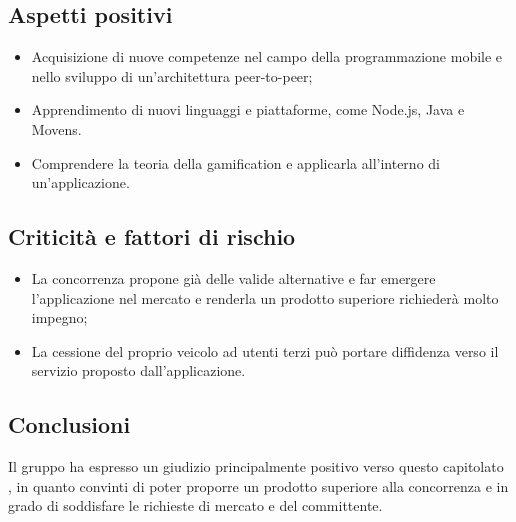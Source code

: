 \subsection{Aspetti positivi}
\begin{itemize}
	\item Acquisizione di nuove competenze nel campo della programmazione mobile e nello sviluppo di un'architettura peer-to-peer\glo{};
	\item Apprendimento di nuovi linguaggi e piattaforme, come Node.js, Java e Movens.
	\item Comprendere la teoria della gamification\glo{} e applicarla all'interno di un'applicazione.
\end{itemize}
\subsection{Criticità e fattori di rischio}
\begin{itemize}
	\item La concorrenza propone già delle valide alternative e far emergere l'applicazione nel mercato e renderla un prodotto superiore richiederà molto impegno;
	\item La cessione del proprio veicolo ad utenti terzi può portare diffidenza verso il servizio proposto dall'applicazione.
\end{itemize}
\subsection{Conclusioni}
Il gruppo ha espresso un giudizio principalmente positivo verso questo capitolato \glo,
in quanto convinti di poter proporre un prodotto superiore alla concorrenza e in grado di soddisfare le richieste di mercato e del committente.